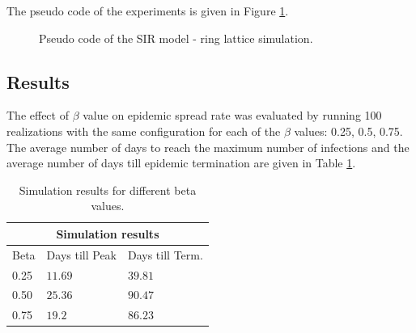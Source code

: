 \documentclass{article}
\begin{document}
\noindent
The pseudo code of the experiments is given in Figure \ref{fig_pseudocode}.
\begin{figure}[!htb]
\begin{center}
\end{center}
\caption{Pseudo code of the SIR model - ring lattice simulation.}
\label{fig_pseudocode}
\end{figure}

\subsection*{Results}
The effect of $\beta$ value on epidemic spread rate was evaluated by running 100 realizations with the same configuration for each of the $\beta$ values: 0.25, 0.5, 0.75. The average number of days to reach the maximum number of infections and the average number of days till epidemic termination are given in Table \ref{results}.

\begin{table} [H]
\centering
\begin{tabular}{ |p{2cm}|p{3cm}|p{3cm}| }
\hline
\multicolumn{3}{|c|}{Simulation results} \\
\hline
Beta & Days till Peak & Days till Term. \\
\hline
0.25 & $11.69$ & $39.81$ \\
0.50 & $25.36$ & $90.47$ \\
0.75 & $19.2$ & $86.23$ \\
\hline
\end{tabular}
\caption{Simulation results for different beta values.}
\label{results}
\end{table} 
\end{document}
